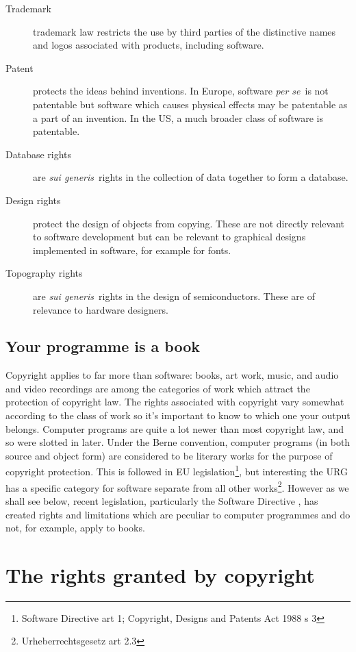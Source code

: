 \documentclass[a4paper,12pt]{article}
\newcommand{\CDPA}[1][]{Copyright, Designs and Patents Act 1988 #1\xspace}
\newcommand{\SD}[1][]{Software Directive #1\xspace}
\newcommand{\URG}[1][]{Urheberrechtsgesetz #1\xspace}
\begin{document}
\begin{description}
\item[Trademark] trademark law restricts the use by third parties of the
  distinctive names and logos associated with products, including software.
\item[Patent] protects the ideas behind inventions. In Europe, software
  \emph{per se}\ is not patentable but software which causes physical
  effects may be patentable as a part of an invention. In the US, a much
  broader class of software is patentable.
\item[Database rights] are \emph{sui generis}\ rights in the collection of
  data together to form a database.
\item[Design rights] protect the design of objects from copying. These are
  not directly relevant to software development but can be relevant to
  graphical designs implemented in software, for example for fonts.
\item[Topography rights] are \emph{sui generis}\ rights in the design of
  semiconductors. These are of relevance to hardware designers.
\end{description}

\subsection{Your programme is a book}

Copyright applies to far more than software: books, art work, music, and audio
and video recordings are among the categories of work which attract the
protection of copyright law. The rights associated with copyright vary
somewhat according to the class of work so it's important to know to which
one your output belongs. Computer programs are quite a lot newer than most copyright
law, and so were slotted in later. Under the Berne convention, computer programs (in both source and
object form) are considered to be literary works for the purpose of
copyright protection. This is followed in EU legislation\footnote{\SD[art 1]; \CDPA[s 3]}, but interesting
the URG has a specific category for software separate from all other
works\footnote{\URG{art 2.3}}. However as we shall
see below, recent legislation, particularly the \SD, has created
rights and limitations which are peculiar to computer programmes and do
not, for example, apply to books.

\section{The rights granted by copyright}
\end{document}
